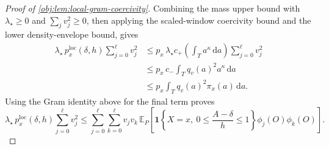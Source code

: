 \begin{proof}[Proof of \cref{obj:lem:local-gram-coercivity}]
Combining the mass upper bound with \(\lambda_\star\ge0\) and \(\sum_j v_j^2\ge0\), then applying the scaled-window coercivity bound and the lower density-envelope bound, gives
\[
\begin{aligned}
\lambda_\star\,p_x^{\mathrm{loc}}(\delta,h)\sum_{j=0}^{\ell}v_j^2
&\le
p_x\,\lambda_\star c_+\!\left(\int_T a^\kappa\,\mathrm da\right)
\sum_{j=0}^{\ell}v_j^2 \\
&\le
p_x\,c_-\int_T q_v(a)^2a^\kappa\,\mathrm da \\
&\le
p_x\int_T q_v(a)^2\pi_x(a)\,\mathrm da .
\end{aligned}
\]
Using the Gram identity above for the final term proves
\[
\lambda_\star\,p_x^{\mathrm{loc}}(\delta,h)\sum_{j=0}^{\ell}v_j^2
\le
\sum_{j=0}^{\ell}\sum_{k=0}^{\ell}
v_jv_k\,
\mathbb E_P\!\left[
\mathbf 1\!\left\{X=x,\ 0\le \frac{A-\delta}{h}\le 1\right\}
\phi_j(O)\phi_k(O)\right].
\]
\end{proof}
